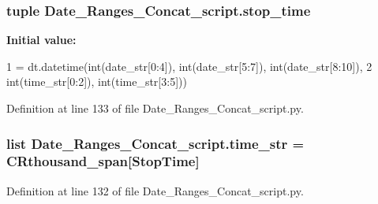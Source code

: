\subsubsection[{stop\+\_\+time}]{\setlength{\rightskip}{0pt plus 5cm}tuple Date\+\_\+\+Ranges\+\_\+\+Concat\+\_\+script.\+stop\+\_\+time}\label{namespace_date___ranges___concat__script_a81b3856c7074c340f9a8124ee1335487}
{\bfseries Initial value\+:}
\begin{DoxyCode}
1 = dt.datetime(int(date\_str[0:4]), int(date\_str[5:7]), int(date\_str[8:10]),
2                                     int(time\_str[0:2]), int(time\_str[3:5]))
\end{DoxyCode}


Definition at line 133 of file Date\+\_\+\+Ranges\+\_\+\+Concat\+\_\+script.\+py.

\hypertarget{namespace_date___ranges___concat__script_ace8dedb82d3f22c382b819ebb4656329}{}
\subsubsection[{time\+\_\+str}]{\setlength{\rightskip}{0pt plus 5cm}list Date\+\_\+\+Ranges\+\_\+\+Concat\+\_\+script.\+time\+\_\+str = {\bf C\+Rthousand\+\_\+span}\mbox{[}\textquotesingle{}Stop\+Time\textquotesingle{}\mbox{]}}\label{namespace_date___ranges___concat__script_ace8dedb82d3f22c382b819ebb4656329}


Definition at line 132 of file Date\+\_\+\+Ranges\+\_\+\+Concat\+\_\+script.\+py.

